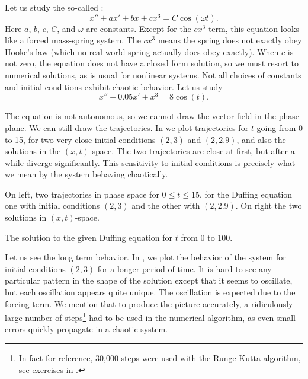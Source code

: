 Let us study the so-called \emph{}:
\begin{equation*}
x'' + a x' + bx + cx^3 = C \cos(\omega t) .
\end{equation*}
Here $a$, $b$, $c$, $C$, and $\omega$ are constants.
Except for the $c x^3$ term, this equation looks like
a forced mass-spring system.  The $c x^3$ means the spring does
not exactly obey Hooke's law (which no real-world spring actually does obey
exactly).  When $c$ is not zero, the equation does not have a closed
form solution, so we must resort to numerical solutions, as is usual for
nonlinear systems.  Not all choices of constants and initial conditions
exhibit chaotic behavior.  Let us study
\begin{equation*}
x''+0.05 x' + x^3 = 8\cos(t) .
\end{equation*}

The equation is not autonomous, so we cannot 
draw the vector field in the phase plane.
We can still draw the
trajectories.   
In  we plot trajectories for $t$ going from 0
to 15, for two very close initial conditions
$(2,3)$ and $(2,2.9)$, and also the solutions in the $(x,t)$ space.  The two
trajectories are close at first, but after a while diverge significantly.
This sensitivity to initial conditions is precisely what
we mean by the system behaving chaotically.

\begin{myfig}
\capstart
\caption{On left, two trajectories in phase space for $0 \leq t \leq 15$, for the Duffing equation
one with initial conditions $(2,3)$ and the other with $(2,2.9)$.  On
right the two solutions in $(x,t)$-space. \label{nlin:duf-two-traj}}
\end{myfig}

\begin{myfig}
\capstart
{}
\caption{The solution to the given Duffing equation for $t$ from 0 to 100.
\label{nlin:duf-long}}
\end{myfig}

\pagebreak[2]
Let us see the long term behavior.
In ,
we plot the behavior of the system for initial conditions $(2,3)$ for
a longer period of time.
It is hard to see any particular pattern
in the shape of the solution except that it seems to oscillate, but each
oscillation appears quite unique.  The oscillation
is expected due to the forcing term.
We mention that to produce the picture accurately,
a ridiculously large number of steps\footnote{In
fact for reference, 30,000 steps were used with the Runge-Kutta
algorithm, see exercises in .}
had to be used in the numerical
algorithm,
as even small errors quickly propagate in a chaotic system.


